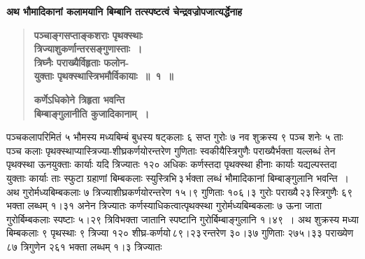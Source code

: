 \documentclass[11pt, openany]{book}
\begin{document}
\newpage

\begin{sloppypar}
{\small \textbf{अथ भौमादिकानां कलामयानि बिम्बानि तत्स्पष्टत्वं चेन्द्रवज्रोपजात्यर्द्धेनाह\textendash }}

 \label{8.1}
\begin{quote}
{\large \textbf{{\color{purple}पञ्चाङ्गसप्ताङ्कशराः पृथक्स्थाः \\
त्रिज्याशुकर्णान्तरसङ्गुणास्ताः~। \\
त्रिघ्नैः पराख्यैर्विहृताः फलोन-\\
युक्ताः पृथक्स्थास्त्रिभमौर्विकायाः~॥~१~॥}}
\vspace{1mm}

 \label{8.2.1}
\textbf{{\color{purple}कर्णेऽधिकोने त्रिहृता भवन्ति \\
बिम्बाङ्गुलानीति कुजादिकानाम्~।}}}
\end{quote}

पञ्चकलापरिमितं ५ भौमस्य मध्यबिम्बं बुधस्य षट्कलाः ६ सप्त गुरोः ७ नव शुक्रस्य ९ पञ्च शनेः ५ ताः पञ्च कलाः पृथक्स्थाप्यास्त्रिज्या-शीघ्रकर्णयोरन्तरेण गुणिताः स्वकीयैस्त्रिगुणैः पराख्यैर्भक्ता यल्लब्धं तेन पृथक्स्था ऊनयुक्ताः कार्याः यदि त्रिज्यातः १२० अधिकः कर्णस्तदा पृथक्स्था हीनाः कार्याः यद्यल्पस्तदा युक्ताः कार्याः ताः स्फुटा ग्रहाणां बिम्बकलाः स्युस्त्रिभि\textendash \,३\textendash \,र्भक्ता लब्धं भौमादिकानां बिम्बाङ्गुलानि भवन्ति~। अथ गुरोर्मध्यबिम्बकलाः ७ त्रिज्याशीघ्रकर्णयोरन्तरेण १५।९ गुणिताः १०६।३ गुरोः पराख्यै\textendash \,२३\textendash \,स्त्रिगुणैः ६९ भक्ता लब्धम् १।३१ अनेन त्रिज्यातः कर्णस्याधिकत्वात्पृथक्स्था गुरोर्मध्यबिम्बकलाः ७ ऊना जाता गुरोर्बिम्बकलाः स्पष्टाः ५।२९ त्रिविभक्ता जातानि स्पष्टानि गुरोर्बिम्बाङ्गुलानि १।४९~। अथ शुक्रस्य मध्या बिम्बकलाः ९ पृथस्थाः ९ त्रिज्या १२० शीघ्र-कर्णयो\textendash \,८९।२३\textendash \,रन्तरेण ३०।३७ गुणिताः २७५।३३ पराख्येण ८७ त्रिगुणेन २६१ भक्ता लब्धम् १।३ त्रिज्यातः
\end{sloppypar}

\newpage
\end{document}

